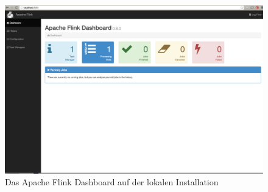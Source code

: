 \begin{figure}[htb!]
\centering
\includegraphics[width=1.0\textwidth]{bilder/flink2.png}
\caption{Das Apache Flink Dashboard auf der lokalen Installation}
\label{fig:flink dashboard]}
\end{figure} 


